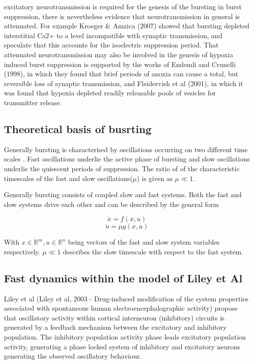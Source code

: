 \documentclass[a4paper,12pt]{article}
\begin{document}
excitatory neurotransmission is required for the genesis of the bursting
in burst suppression, there is nevertheless evidence that
neurotransmission in general is attenuated. For example Kroeger \&
Amzica (2007) showed that bursting depleted interstitial Ca2+ to a
level incompatible with synaptic transmission, and speculate that this
accounts for the isoelectric suppression period. That attenuated
neurotransmission may also be involved in the genesis of hypoxia
induced burst suppression is supported by the works of Endemli and
Crunelli (1998), in which they found that brief periods of anoxia can
cause a total, but reversible loss of synaptic transmission, and
Fleidervish et al (2001), in which it was found that hypoxia depleted
readily releasable pools of vesicles for transmitter release.

\subsection{Theoretical basis of busrting}
Generally bursting is characterised by oscillations occurring on two different time scales \cite{izikevich2007_1}. Fast
oscillations underlie the active phase of bursting and slow oscillations underlie the quiescent periods of suppression.
The ratio of of the characteristic timescales of the fast and slow oscillations($\mu$) is given as $\mu \ll 1$. 

Generally bursting consists of coupled slow and fast systems. Both the fast and slow systems drive each other and can be
described by the general form

\begin{equation} \label{fast_gen_form}
\dot{x}=f(x, u)   
\end{equation}
\begin{equation} \label{slow_gen_form}
\dot{u}=\mu g(x, u)
\end{equation}

With $x \in \mathbb{R}^m, u \in \mathbb{R}^n$ being vectors of the fast and slow system variables respectively. $\mu \ll
1$ describes the slow timescale with respect to the fast system.

\subsection{Fast dynamics within the model of Liley et Al}
Liley et al (Liley et al, 2003 - Drug-induced modification of the system properties associated
with spontaneous human electroencephalographic activity) propose that oscillatory activity within cortical interneuron
(inhibitory) circuits is generated by a feedback mechanism between the excitatory and inhibitory population.
The inhibitory population activity phase leads excitatory population activity, generating a phase locked system of
inhibitory and excitatory neurons generating the observed oscillatory behaviour.
\end{document}
